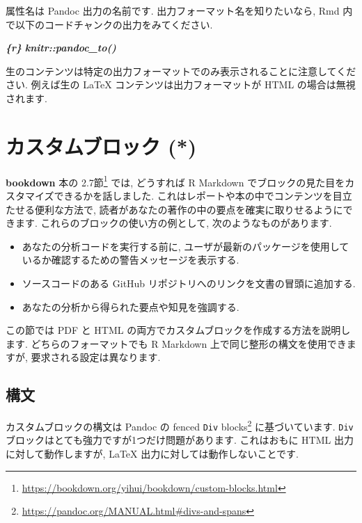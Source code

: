 \documentclass[
  11pt,
  lualatex,
  ja=standard]{bxjsreport}
\newenvironment{Shaded}{\begin{snugshade}}{\end{snugshade}}
\newcommand{\InformationTok}[1]{\textcolor[rgb]{0.56,0.35,0.01}{\textbf{\textit{#1}}}}
\providecommand{\tightlist}{%
  \setlength{\itemsep}{0pt}\setlength{\parskip}{0pt}}
\renewcommand{\href}[2]{#2\footnote{\url{#1}}}
\begin{document}
属性名は Pandoc 出力の名前です. 出力フォーマット名を知りたいなら, Rmd 内で以下のコードチャンクの出力をみてください.

\begin{Shaded}
\begin{Highlighting}[]
\InformationTok{\textasciigrave{}\textasciigrave{}\textasciigrave{}\{r\}}
\InformationTok{knitr::pandoc\_to()}
\InformationTok{\textasciigrave{}\textasciigrave{}\textasciigrave{}}
\end{Highlighting}
\end{Shaded}

生のコンテンツは特定の出力フォーマットでのみ表示されることに注意してください. 例えば生の LaTeX コンテンツは出力フォーマットが HTML の場合は無視されます.

\hypertarget{custom-blocks}{%
\section{カスタムブロック (*)}\label{custom-blocks}}

\textbf{bookdown} 本の \href{https://bookdown.org/yihui/bookdown/custom-blocks.html}{2.7節} では, どうすれば R Markdown でブロックの見た目をカスタマイズできるかを話しました. これはレポートや本の中でコンテンツを目立たせる便利な方法で, 読者があなたの著作の中の要点を確実に取りせるようにできます. これらのブロックの使い方の例として, 次のようなものがあります.

\begin{itemize}
\tightlist
\item
  あなたの分析コードを実行する前に, ユーザが最新のパッケージを使用しているか確認するための警告メッセージを表示する.
\item
  ソースコードのある GitHub リポジトリへのリンクを文書の冒頭に追加する.
\item
  あなたの分析から得られた要点や知見を強調する.
\end{itemize}

この節では PDF と HTML の両方でカスタムブロックを作成する方法を説明します. どちらのフォーマットでも R Markdown 上で同じ整形の構文を使用できますが, 要求される設定は異なります.

\hypertarget{block-syntax}{%
\subsection{構文}\label{block-syntax}}

カスタムブロックの構文は Pandoc の \href{https://pandoc.org/MANUAL.html\#divs-and-spans}{fenced \texttt{Div} blocks} に基づいています. \texttt{Div} ブロックはとても強力ですが1つだけ問題があります. これはおもに HTML 出力に対して動作しますが, LaTeX 出力に対しては動作しないことです.
\end{document}
